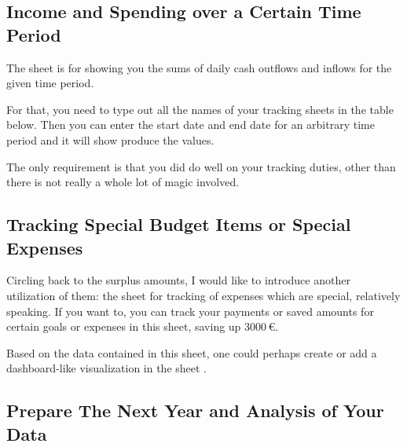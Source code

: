 \subsection{Income and Spending over a Certain Time Period}
\label{subsec:income-and-spending-certain-time-period}

The sheet  is for showing you the sums of daily cash outflows and inflows for the given time period.

For that, you need to type out all the names of your tracking sheets in the table below.
Then you can enter the start date and end date for an arbitrary time period and it will show produce the values.

The only requirement is that you did do well on your tracking duties, other than there is not really a whole lot of magic involved.

\subsection{Tracking Special Budget Items or Special Expenses}
\label{subsec:tracking-special-expenses}

Circling back to the surplus amounts, I would like to introduce another utilization of them: the sheet for tracking of expenses which are special, relatively speaking.
If you want to, you can track your payments or saved amounts for certain goals or expenses in this sheet, \ie saving up 3000\,€.

Based on the data contained in this sheet, one could perhaps create or add a dashboard-like visualization in the sheet .


\subsection{Prepare The Next Year and Analysis of Your Data}
\label{subsec:prepare-the-next-year-analysis}

